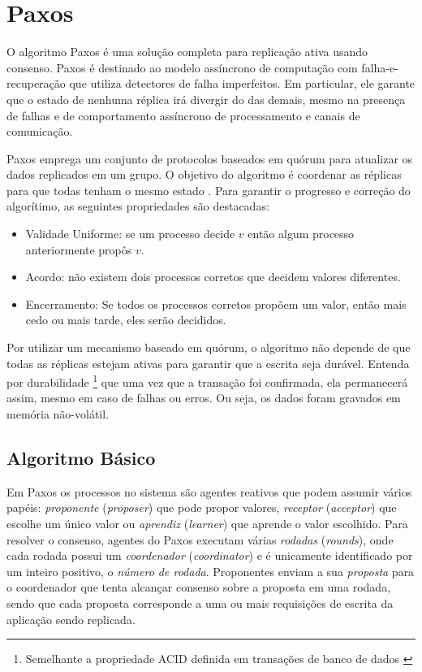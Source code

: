 \section{Paxos}\label{sec:paxos}

O algoritmo Paxos \cite{lamport98} é uma solução completa para replicação ativa usando
consenso. Paxos é destinado ao modelo assíncrono de computação com falha-e-recuperação que
utiliza detectores de falha imperfeitos. Em particular, ele garante que o estado de
nenhuma réplica irá divergir do das demais, mesmo na presença de falhas e de comportamento
assíncrono de processamento e canais de comunicação.

Paxos emprega um conjunto de protocolos baseados em quórum para atualizar os dados
replicados em um grupo. O objetivo do algoritmo é coordenar as réplicas para que todas
tenham o mesmo estado \cite{cachin11}. Para garantir o progresso e correção do algorítimo,
as seguintes propriedades são destacadas:

\begin{itemize}
  \item Validade Uniforme: se um processo decide $v$ então algum processo anteriormente
    propôs $v$.
  \item Acordo: não existem dois processos corretos que decidem valores diferentes.
  \item Encerramento: Se todos os processos corretos propõem um valor, então mais cedo ou
    mais tarde, eles serão decididos.
\end{itemize}

Por utilizar um mecanismo baseado em quórum, o algoritmo não depende de que todas as
réplicas estejam ativas para garantir que a escrita seja durável. Entenda por durabilidade
\footnote{Semelhante a propriedade ACID definida em transações de banco de dados
\cite{haerder83}} que uma vez que a transação foi confirmada, ela permanecerá assim, mesmo
em caso de falhas ou erros. Ou seja, os dados foram gravados em memória não-volátil.

\subsection{Algoritmo Básico}\label{subsec:algoritmo_basico}

Em Paxos os processos no sistema são agentes reativos que podem assumir vários
papéis: \emph{proponente} (\emph{proposer}) que pode propor valores, \emph{receptor}
(\emph{acceptor}) que escolhe um único valor ou \emph{aprendiz} (\emph{learner}) que
aprende o valor escolhido. Para resolver o consenso, agentes do Paxos executam várias
\emph{rodadas} (\emph{rounds}), onde cada rodada possui um \emph{coordenador}
(\emph{coordinator}) e é unicamente identificado por um inteiro positivo, o \emph{número
de rodada}. Proponentes enviam a sua \emph{proposta} para o coordenador que tenta alcançar
consenso sobre a proposta em uma rodada, sendo que cada proposta corresponde a uma ou mais
requisições de escrita da aplicação sendo replicada.

